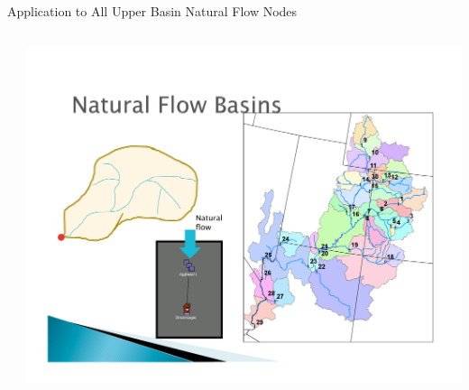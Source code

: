 \documentclass{beamer}
\begin{document}
\begin{frame}{Application to All Upper Basin Natural Flow Nodes}
\begin{columns}
\begin{column}{.5\textwidth}
{}
\end{column}
\begin{column}{.5\textwidth}
\includegraphics[width=\textwidth]{figs/natural-flow-nodes.pdf}
\end{column}
\end{columns}
\end{frame}
\end{document}

